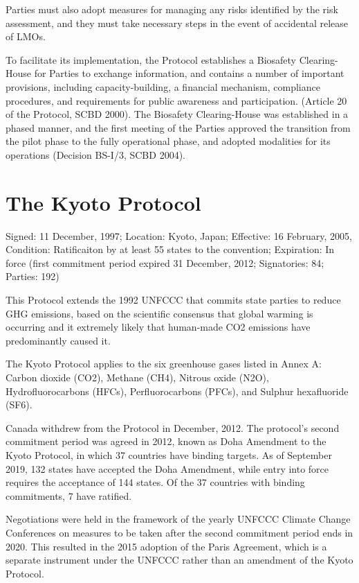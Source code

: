 \documentclass[
]{book}
\begin{document}
Parties must also adopt measures for managing any risks identified by the risk assessment, and they must take necessary steps in the event of accidental release of LMOs.

To facilitate its implementation, the Protocol establishes a Biosafety Clearing-House for Parties to exchange information, and contains a number of important provisions, including capacity-building, a financial mechanism, compliance procedures, and requirements for public awareness and participation. (Article 20 of the Protocol, SCBD 2000). The Biosafety Clearing-House was established in a phased manner, and the first meeting of the Parties approved the transition from the pilot phase to the fully operational phase, and adopted modalities for its operations (Decision BS-I/3, SCBD 2004).

\hypertarget{the-kyoto-protocol}{%
\section{The Kyoto Protocol}\label{the-kyoto-protocol}}

Signed: 11 December, 1997; Location: Kyoto, Japan; Effective: 16 February, 2005, Condition: Ratificaiton by at least 55 states to the convention; Expiration: In force (first commitment period expired 31 December, 2012; Signatories: 84; Parties: 192)

This Protocol extends the 1992 UNFCCC that commits state parties to reduce GHG emissions, based on the scientific consensus that global warming is occurring and it extremely likely that human-made CO2 emissions have predominantly caused it.

The Kyoto Protocol applies to the six greenhouse gases listed in Annex A: Carbon dioxide (CO2), Methane (CH4), Nitrous oxide (N2O), Hydrofluorocarbons (HFCs), Perfluorocarbons (PFCs), and Sulphur hexafluoride (SF6).

Canada withdrew from the Protocol in December, 2012. The protocol's second commitment period was agreed in 2012, known as Doha Amendment to the Kyoto Protocol, in which 37 countries have binding targets. As of September 2019, 132 states have accepted the Doha Amendment, while entry into force requires the acceptance of 144 states. Of the 37 countries with binding commitments, 7 have ratified.

Negotiations were held in the framework of the yearly UNFCCC Climate Change Conferences on measures to be taken after the second commitment period ends in 2020. This resulted in the 2015 adoption of the Paris Agreement, which is a separate instrument under the UNFCCC rather than an amendment of the Kyoto Protocol.
\end{document}
